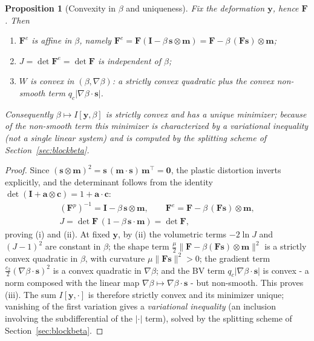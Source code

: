 \documentclass[12pt]{article}
\theoremstyle{plain}
\newtheorem{proposition}[theorem]{Proposition}
\theoremstyle{definition}
\newcommand{\bF}{\bm{F}}
\newcommand{\bs}{\bm{s}}
\newcommand{\bmm}{\bm{m}}
\newcommand{\by}{\bm{y}}
\newcommand{\bI}{\bm{I}}
\newcommand{\Fe}{\bF^{e}}
\newcommand{\Fp}{\bF^{p}}
\begin{document}
\begin{proposition}[Convexity in $\beta$ and uniqueness]\label{prop:convex-beta}
Fix the deformation $\by$, hence $\bF$. Then
\begin{enumerate}\setlength{\itemsep}{4pt}
  \item[\textnormal{(i)}] $\Fe$ is affine in $\beta$, namely
  $\Fe=\bF(\bI-\beta\,\bs\otimes\bmm)=\bF-\beta\,(\bF\bs)\otimes\bmm$;
  \item[\textnormal{(ii)}] $J=\det\Fe=\det\bF$ is independent of $\beta$;
  \item[\textnormal{(iii)}] $W$ is convex in $(\beta,\nabla\beta)$: a strictly
  convex quadratic plus the convex \emph{non-smooth} term
  $q_c|\nabla\beta\cdot\bs|$.
\end{enumerate}
Consequently $\beta\mapsto I[\by,\beta]$ is strictly convex and has a
\emph{unique} minimizer; because of the non-smooth term this minimizer is
characterized by a variational inequality (not a single linear system) and is
computed by the splitting scheme of Section~\ref{sec:blockbeta}.
\end{proposition}

\begin{proof}
Since $(\bs\otimes\bmm)^{2}=\bs\,(\bmm\cdot\bs)\,\bmm^{\!\top}=\bm0$, the
plastic distortion inverts explicitly, and the determinant follows from the
identity $\det(\bI+\bm{a}\otimes\bm{c})=1+\bm{a}\cdot\bm{c}$:
\begin{gather*}
  (\Fp)^{-1}=\bI-\beta\,\bs\otimes\bmm,\qquad
  \Fe=\bF-\beta\,(\bF\bs)\otimes\bmm,\\
  J=\det\bF\,(1-\beta\,\bs\cdot\bmm)=\det\bF,
\end{gather*}
proving (i) and (ii). At fixed $\by$, by (ii) the volumetric terms $-2\ln J$
and $(J-1)^{2}$ are constant in $\beta$; the shape term
$\tfrac{\mu}{2}\|\bF-\beta(\bF\bs)\otimes\bmm\|^{2}$ is a strictly convex
quadratic in $\beta$, with curvature $\mu\|\bF\bs\|^{2}>0$; the gradient term
$\tfrac{c_2}{2}(\nabla\beta\cdot\bs)^{2}$ is a convex quadratic in
$\nabla\beta$; and the BV term $q_c|\nabla\beta\cdot\bs|$ is convex - a norm
composed with the linear map $\nabla\beta\mapsto\nabla\beta\cdot\bs$ - but
non-smooth. This proves (iii). The sum $I[\by,\cdot]$ is therefore strictly
convex and its minimizer unique; vanishing of the first variation gives a
\emph{variational inequality} (an inclusion involving the subdifferential of
the $|\cdot|$ term), solved by the splitting scheme of
Section~\ref{sec:blockbeta}.
\end{proof}
\end{document}
